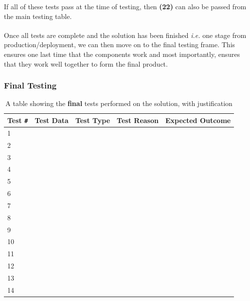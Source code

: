 \documentclass[9pt]{article}
\begin{document}
If all of these tests pass at the time of testing, then \textbf{(22)} can also be passed from the main testing table.\\\\
Once all tests are complete and the solution has been finished \textit{i.e.} one stage from production/deployment, we can then move on to the final testing frame. This ensures one last time that the components work and most importantly, ensures that they work well together to form the final product.




























\newpage
\subsubsection{Final Testing}
\begin{table}[H]
	\centering
	\begin{tabularx}{\textwidth}{lXlXX}
		\textbf{Test} \verb|#| & \textbf{Test Data}            & \textbf{Test Type} & \textbf{Test Reason}           & \textbf{Expected Outcome}      \\ \midrule
		1   &  &  &  & \\
		2   &  &  &  & \\
		3   &  &  &  & \\
		4   &  &  &  & \\
		5   &  &  &  & \\
		6   &  &  &  & \\
		7   &  &  &  & \\
		8   &  &  &  & \\
		9   &  &  &  & \\
		10  &  &  &  & \\
		11  &  &  &  & \\
		12  &  &  &  & \\
		13  &  &  &  & \\
		14  &  &  &  & \\ \bottomrule
	\end{tabularx}
	\caption{A table showing the \textbf{final} tests performed on the solution, with justification}
	\label{tab_testingDesignSolutionFinal}
\end{table}
\end{document}
